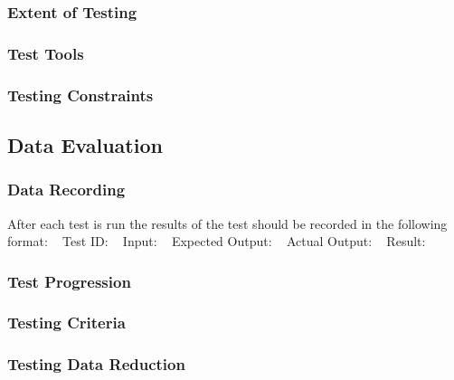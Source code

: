 \documentclass[12pt]{article}
\begin{document}
\subsubsection{Extent of Testing}

\subsubsection{Test Tools}

\subsubsection{ Testing Constraints}


\subsection{ Data Evaluation}

\subsubsection{Data Recording}
After each test is run the results of the test should be recorded in the following format: 
~\newline
Test ID: 
~\newline
Input:
~\newline
Expected Output:
~\newline
Actual Output:
~\newline
Result: 

\subsubsection{Test Progression}


\subsubsection{ Testing Criteria}


\subsubsection{ Testing Data Reduction}


%
%
\end{document}
